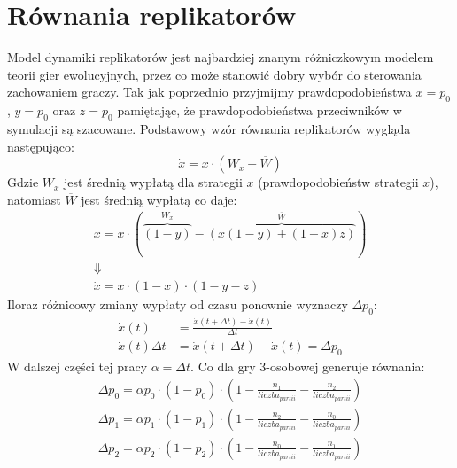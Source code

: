 \section{Równania replikatorów}
\label{sec:r_repli}
Model dynamiki replikatorów jest najbardziej znanym różniczkowym modelem teorii gier ewolucyjnych, przez co może stanowić dobry wybór do sterowania zachowaniem graczy. Tak jak poprzednio przyjmijmy prawdopodobieństwa $x=p_0$, $y=p_0$ oraz $z=p_0$ pamiętając, że prawdopodobieństwa przeciwników w symulacji są szacowane. Podstawowy wzór równania replikatorów wygląda następująco:
\begin{equation}
\dot{x} = x \cdot ( W_x - \overline{W})
\end{equation}
Gdzie $W_x$ jest średnią wypłatą dla strategii $x$ (prawdopodobieństw strategii $x$), natomiast $\overline{W}$ jest średnią wypłatą co daje:
\begin{gather*}
\dot{x} = x \cdot ( \overbrace{(1-y)}^{W_x} - \overbrace{(x(1-y) + (1-x)z)}^{\overline{W}}) \\
\Downarrow \\
\dot{x} = x \cdot (1-x) \cdot (1-y-z)
\end{gather*}
Iloraz różnicowy zmiany wypłaty od czasu ponownie wyznaczy $\Delta p_0$:
\begin{align*}
\dot{x}(t) &= \frac{\dot{x}(t+\Delta t)-\dot{x}(t)}{\Delta t} \\
\dot{x}(t) \Delta t &= \dot{x}(t+\Delta t)-\dot{x}(t) = \Delta p_0
\end{align*} 
W dalszej części tej pracy $\alpha=\Delta t$. Co dla gry 3-osobowej generuje równania:
\begin{align} \label{eq:repli}
\Delta p_0 = \alpha p_0 \cdot (1 - p_0) \cdot (1 - \frac{n_1}{liczba_{partii}} - \frac{n_2}{liczba_{partii}}) \nonumber \\
\Delta p_1 = \alpha p_1 \cdot (1 - p_1) \cdot (1 - \frac{n_2}{liczba_{partii}} - \frac{n_0}{liczba_{partii}}) \\
\Delta p_2 = \alpha p_2 \cdot (1 - p_2) \cdot (1 - \frac{n_0}{liczba_{partii}} - \frac{n_1}{liczba_{partii}}) \nonumber
\end{align} 


